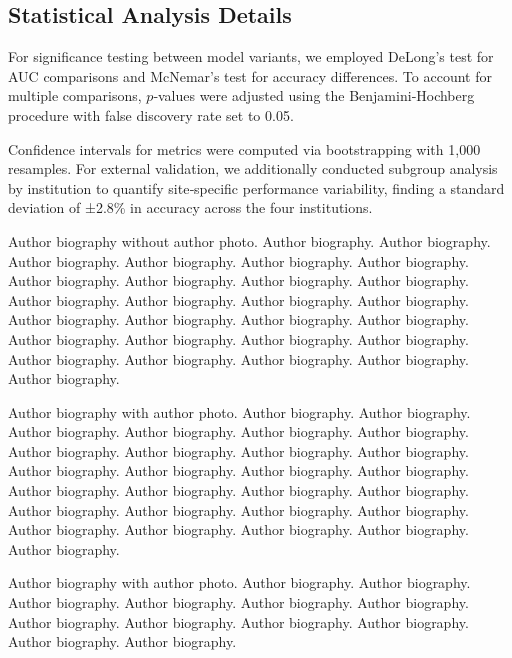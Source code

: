 \documentclass[a4paper, fleqn]{cas-dc}
\begin{document}
    \subsection{Statistical Analysis Details}
    For significance testing between model variants, we employed DeLong's test for
    AUC comparisons and McNemar's test for accuracy differences. To account for
    multiple comparisons, $p$‑values were adjusted using the Benjamini‑Hochberg
    procedure with false discovery rate set to 0.05.

    Confidence intervals for metrics were computed via bootstrapping with 1,000
    resamples. For external validation, we additionally conducted subgroup
    analysis by institution to quantify site‐specific performance variability, finding
    a standard deviation of ±2.8\% in accuracy across the four institutions.

    \printcredits

    

    


    \bio{} Author biography without author photo. Author biography. Author
    biography. Author biography. Author biography. Author biography. Author
    biography. Author biography. Author biography. Author biography. Author
    biography. Author biography. Author biography. Author biography. Author
    biography. Author biography. Author biography. Author biography. Author
    biography. Author biography. Author biography. Author biography. Author
    biography. Author biography. Author biography. Author biography. Author
    biography. Author biography. \endbio

     Author biography with author photo. Author biography. Author
    biography. Author biography. Author biography. Author biography. Author
    biography. Author biography. Author biography. Author biography. Author
    biography. Author biography. Author biography. Author biography. Author
    biography. Author biography. Author biography. Author biography. Author
    biography. Author biography. Author biography. Author biography. Author
    biography. Author biography. Author biography. Author biography. Author
    biography. Author biography. \endbio

     Author biography with author photo. Author biography. Author
    biography. Author biography. Author biography. Author biography. Author
    biography. Author biography. Author biography. Author biography. Author
    biography. Author biography. Author biography. \endbio
\end{document}

